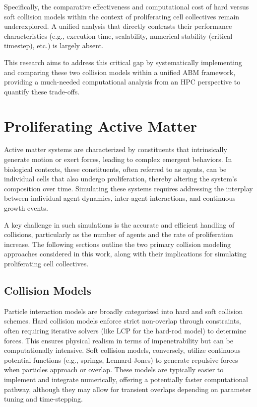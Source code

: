 \documentclass[conference]{IEEEtran}
\begin{document}
Specifically, the comparative effectiveness and computational cost of hard versus soft collision models within the context of proliferating cell collectives remain underexplored. A unified analysis that directly contrasts their performance characteristics (e.g., execution time, scalability, numerical stability (critical timestep), etc.) is largely absent.

This research aims to address this critical gap by systematically implementing and comparing these two collision models within a unified ABM framework, providing a much-needed computational analysis from an HPC perspective to quantify these trade-offs.


\section{Proliferating Active Matter}

Active matter systems are characterized by constituents that intrinsically generate motion or exert forces, leading to complex emergent behaviors. In biological contexts, these constituents, often referred to as agents, can be individual cells that also undergo proliferation, thereby altering the system's composition over time. Simulating these systems requires addressing the interplay between individual agent dynamics, inter-agent interactions, and continuous growth events.

A key challenge in such simulations is the accurate and efficient handling of collisions, particularly as the number of agents and the rate of proliferation increase. The following sections outline the two primary collision modeling approaches considered in this work, along with their implications for simulating proliferating cell collectives.

\subsection{Collision Models}

Particle interaction models are broadly categorized into hard and soft collision schemes. Hard collision models enforce strict non-overlap through constraints, often requiring iterative solvers (like LCP for the hard-rod model) to determine forces. This ensures physical realism in terms of impenetrability but can be computationally intensive. Soft collision models, conversely, utilize continuous potential functions (e.g., springs, Lennard-Jones) to generate repulsive forces when particles approach or overlap. These models are typically easier to implement and integrate numerically, offering a potentially faster computational pathway, although they may allow for transient overlaps depending on parameter tuning and time-stepping.
\end{document}
